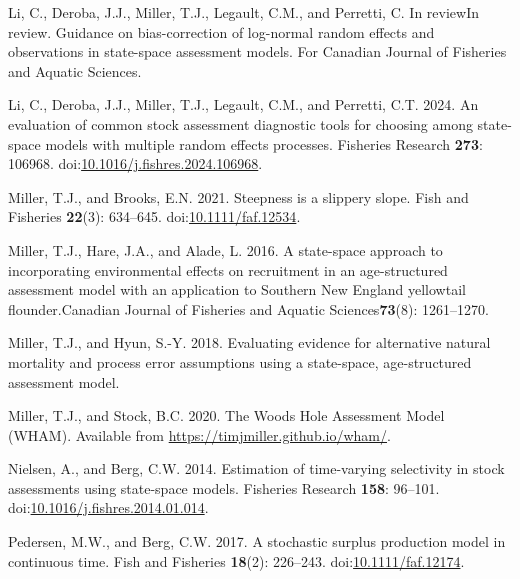 \documentclass[
  12pt,
]{article}
\newlength{\cslhangindent}
\newlength{\cslentryspacingunit} %
\newenvironment{CSLReferences}[2] %
 {%
  \setlength{\parindent}{0pt}
  \ifodd #1
  \let\oldpar\par
  \def\par{\hangindent=\cslhangindent\oldpar}
  \fi
  \setlength{\parskip}{#2\cslentryspacingunit}
 }%
 {}
\newcommand{\cjfas}{Canadian Journal of Fisheries and Aquatic Sciences\xspace}
\begin{document}
\begin{CSLReferences}{1}{0}
\leavevmode{}%
Li, C., Deroba, J.J., Miller, T.J., Legault, C.M., and Perretti, C. In
reviewIn review. Guidance on bias-correction of log-normal random
effects and observations in state-space assessment models. For Canadian
Journal of Fisheries and Aquatic Sciences.

\leavevmode{}%
Li, C., Deroba, J.J., Miller, T.J., Legault, C.M., and Perretti, C.T.
2024. An evaluation of common stock assessment diagnostic tools for
choosing among state-space models with multiple random effects
processes. Fisheries Research \textbf{273}: 106968.
doi:\href{https://doi.org/10.1016/j.fishres.2024.106968}{10.1016/j.fishres.2024.106968}.

\leavevmode{}%
Miller, T.J., and Brooks, E.N. 2021. Steepness is a slippery slope. Fish
and Fisheries \textbf{22}(3): 634--645.
doi:\href{https://doi.org/10.1111/faf.12534}{10.1111/faf.12534}.

\leavevmode{}%
Miller, T.J., Hare, J.A., and Alade, L. 2016. A state-space approach to
incorporating environmental effects on recruitment in an age-structured
assessment model with an application to {S}outhern {N}ew {E}ngland
yellowtail flounder.\cjfas \textbf{73}(8): 1261--1270.

\leavevmode{}%
Miller, T.J., and Hyun, S.-Y. 2018. Evaluating evidence for alternative
natural mortality and process error assumptions using a state-space,
age-structured assessment model.

\leavevmode{}%
Miller, T.J., and Stock, B.C. 2020. The {Woods Hole Assessment Model}
({WHAM}). Available from \url{https://timjmiller.github.io/wham/}.

\leavevmode{}%
Nielsen, A., and Berg, C.W. 2014. Estimation of time-varying selectivity
in stock assessments using state-space models. Fisheries Research
\textbf{158}: 96--101.
doi:\href{https://doi.org/10.1016/j.fishres.2014.01.014}{10.1016/j.fishres.2014.01.014}.

\leavevmode{}%
Pedersen, M.W., and Berg, C.W. 2017. A stochastic surplus production
model in continuous time. Fish and Fisheries \textbf{18}(2): 226--243.
doi:\href{https://doi.org/10.1111/faf.12174}{10.1111/faf.12174}.


\end{CSLReferences}
\end{document}
